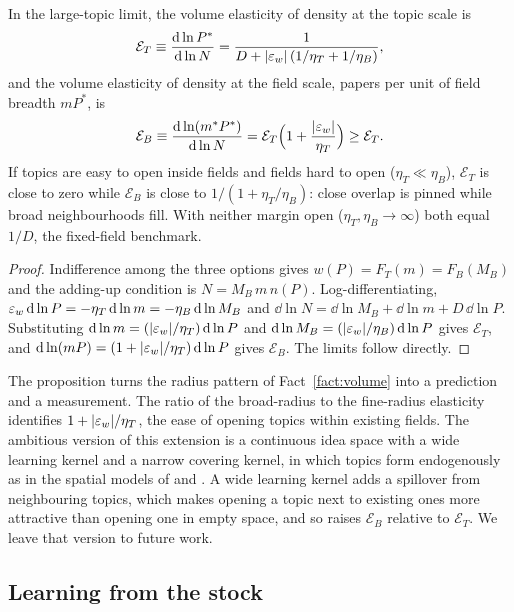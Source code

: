 \begin{proposition}\label{prop:nested}
In the large-topic limit, the volume elasticity of density at the topic scale is
\[
\mathcal E_T\equiv\frac{\mathrm{d}\ln P^*}{\mathrm{d}\ln N}=\frac{1}{D+|\varepsilon_w|\,(1/\eta_T+1/\eta_B)},
\]
and the volume elasticity of density at the field scale, papers per unit of
field breadth $mP^*$, is
\[
\mathcal E_B\equiv\frac{\mathrm{d}\ln(m^*P^*)}{\mathrm{d}\ln N}=\mathcal E_T\Big(1+\frac{|\varepsilon_w|}{\eta_T}\Big)\ge\mathcal E_T .
\]
If topics are easy to open inside fields and fields hard to open
($\eta_T\ll\eta_B$), $\mathcal E_T$ is close to zero while $\mathcal E_B$ is close
to $1/(1+\eta_T/\eta_B)$: close overlap is pinned while broad neighbourhoods
fill. With neither margin open ($\eta_T,\eta_B\to\infty$) both equal $1/D$, the
fixed-field benchmark.
\end{proposition}
\begin{proof}
Indifference among the three options gives $w(P)=F_T(m)=F_B(M_B)$ and the
adding-up condition is $N=M_B\,m\,n(P)$. Log-differentiating,
$\varepsilon_w\,\mathrm{d}\ln P=-\eta_T\,\mathrm{d}\ln m=-\eta_B\,\mathrm{d}\ln M_B$ and
$\dd\ln N=\dd\ln M_B+\dd\ln m+D\,\dd\ln P$. Substituting
$\mathrm{d}\ln m=(|\varepsilon_w|/\eta_T)\,\mathrm{d}\ln P$ and $\mathrm{d}\ln M_B=(|\varepsilon_w|/\eta_B)\,\mathrm{d}\ln P$
gives $\mathcal E_T$, and $\mathrm{d}\ln(mP)=(1+|\varepsilon_w|/\eta_T)\,\mathrm{d}\ln P$ gives
$\mathcal E_B$. The limits follow directly.
\end{proof}

The proposition turns the radius pattern of Fact~\ref{fact:volume} into a
prediction and a measurement. The ratio of the broad-radius to the fine-radius
elasticity identifies $1+|\varepsilon_w|/\eta_T$, the ease of opening topics within
existing fields. The ambitious version of this extension is a continuous idea
space with a wide learning kernel and a narrow covering kernel, in which
topics form endogenously as in the spatial models of
\citet{lucasrossihansberg2002} and \citet{allenarkolakis2014}. A wide learning
kernel adds a spillover from neighbouring topics, which makes opening a topic
next to existing ones more attractive than opening one in empty space, and so
raises $\mathcal E_B$ relative to $\mathcal E_T$. We leave that version to future
work.

\subsection{Learning from the stock}\label{app:stock}

